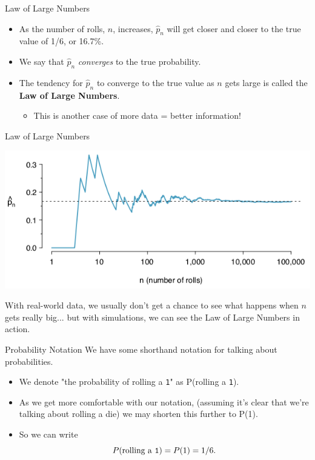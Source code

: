 \begin{frame}{Law of Large Numbers}
    \begin{itemize}
        \item As the number of rolls, $n$, increases, $\hat{p}_n$ will get closer and closer to the true value of 1/6, or 16.7\%.
        \item We say that $\hat{p}_n$ \textit{converges} to the true probability.
        \item The tendency for $\hat{p}_n$ to converge to the true value as $n$ gets large is called the \textbf{Law of Large Numbers}. 
        \begin{itemize}
            \item This is another case of more data = better information!
        \end{itemize}
    \end{itemize}
\end{frame}

\begin{frame}{Law of Large Numbers}
    \begin{center}
        \includegraphics[scale=0.5]{images/lln.png}
    \end{center}
    With real-world data, we usually don't get a chance to see what happens when $n$ gets really big... but with simulations, we can see the Law of Large Numbers in action.
\end{frame}

\begin{frame}{Probability Notation}
    We have some shorthand notation for talking about probabilities.
    \begin{itemize}
        \item We denote "the probability of rolling a \texttt{1}" as P(rolling a \texttt{1}).
        \item As we get more comfortable with our notation, (assuming it's clear that we're talking about rolling a die) we may shorten this further to P(1).
        \item So we can write 
        \[P(\text{rolling a \texttt{1}}) = P(1) = 1/6.\]
    \end{itemize}
\end{frame}

